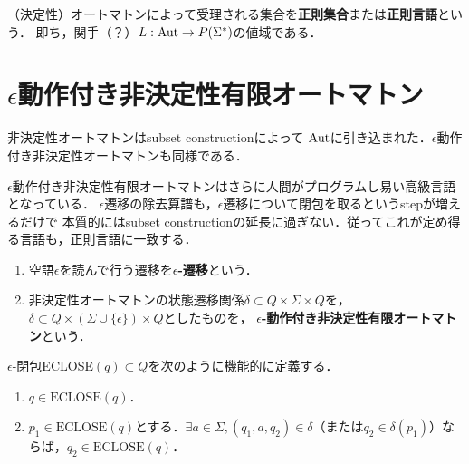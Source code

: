 \documentclass[uplatex, dvipdfmx]{jsreport}
\begin{document}
\begin{definition}
    （決定性）オートマトンによって受理される集合を\textbf{正則集合}または\textbf{正則言語}という．
    即ち，関手（？）$L:\mathrm{Aut}\to P(\Sigma^*)$の値域である．
\end{definition}

\section{$\epsilon$動作付き非決定性有限オートマトン}

\begin{tcolorbox}[colframe=ForestGreen, colback=ForestGreen!10!white, breakable,
    title=$\epsilon$動作付き非決定性オートマトンをAutに引き込む]
    非決定性オートマトンはsubset constructionによって
    $\mathrm{Aut}$に引き込まれた．$\epsilon$動作付き非決定性オートマトンも同様である．

    $\epsilon$動作付き非決定性有限オートマトンはさらに人間がプログラムし易い高級言語となっている．
    $\epsilon$遷移の除去算譜も，$\epsilon$遷移について閉包を取るというstepが増えるだけで
    本質的にはsubset constructionの延長に過ぎない．従ってこれが定め得る言語も，正則言語に一致する．
\end{tcolorbox}

\begin{definition}\mbox{}
    \begin{enumerate}
        \item 空語$\epsilon$を読んで行う遷移を\textbf{$\epsilon$-遷移}という．
        \item 非決定性オートマトンの状態遷移関係$\delta\subset Q\times\Sigma\times Q$を，$\delta\subset Q\times(\Sigma\cup\{\epsilon\})\times Q$としたものを，
        \textbf{$\epsilon$-動作付き非決定性有限オートマトン}という．
    \end{enumerate}
\end{definition}

\begin{definition}
    $\epsilon$-閉包ECLOSE$(q)\subset Q$を次のように機能的に定義する．
    \begin{enumerate}
        \item $q\in\mathrm{ECLOSE}(q)$．
        \item $p_1\in\mathrm{ECLOSE}(q)$とする．$\exists a\in\Sigma, (q_1,a,q_2)\in\delta$（または$q_2\in\delta(p_1)$）ならば，$q_2\in\mathrm{ECLOSE}(q)$．
    \end{enumerate}
\end{definition}
\end{document}
